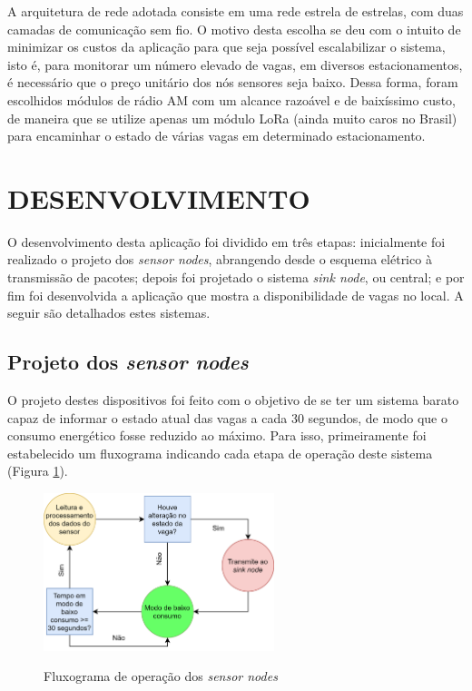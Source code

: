 \documentclass[oneside,openright,12pt]{ufsm_2015} %
\begin{document}
    A arquitetura de rede adotada consiste em uma rede estrela de estrelas, com duas camadas de comunicação sem fio. O motivo desta escolha se deu com o intuito de minimizar os custos da aplicação para que seja possível escalabilizar o sistema, isto é, para monitorar um número elevado de vagas, em diversos estacionamentos, é necessário que o preço unitário dos nós sensores seja baixo. Dessa forma, foram escolhidos módulos de rádio AM com um alcance razoável e de baixíssimo custo, de maneira que se utilize apenas um módulo LoRa (ainda muito caros no Brasil) para encaminhar o estado de várias vagas em determinado estacionamento. 
    
    
    \section{DESENVOLVIMENTO}
    O desenvolvimento desta aplicação foi dividido em três etapas: inicialmente foi realizado o projeto dos \textit{sensor nodes}, abrangendo desde o esquema elétrico à transmissão de pacotes; depois foi projetado o sistema \textit{sink node}, ou central; e por fim foi desenvolvida a aplicação que mostra a disponibilidade de vagas no local. A seguir são detalhados estes sistemas.
    
    \subsection{Projeto dos \textit{sensor nodes}}
    O projeto destes dispositivos foi feito com o objetivo de se ter um sistema barato capaz de informar o estado atual das vagas a cada 30 segundos, de modo que o consumo energético fosse reduzido ao máximo. Para isso, primeiramente foi estabelecido um fluxograma indicando cada etapa de operação deste sistema (Figura \ref{fig:flux-sensor-node}).
    
    \begin{figure}[ht]
     	    \caption{\label{exepretex} Fluxograma de operação dos \textit{sensor nodes}}
            \centering
            \includegraphics[width=0.6\textwidth]{figuras/sensor-node-fluxograma.png}
            \vspace{\baselineskip} %
                \label{fig:flux-sensor-node}
    \end{figure}
    
\end{document}
